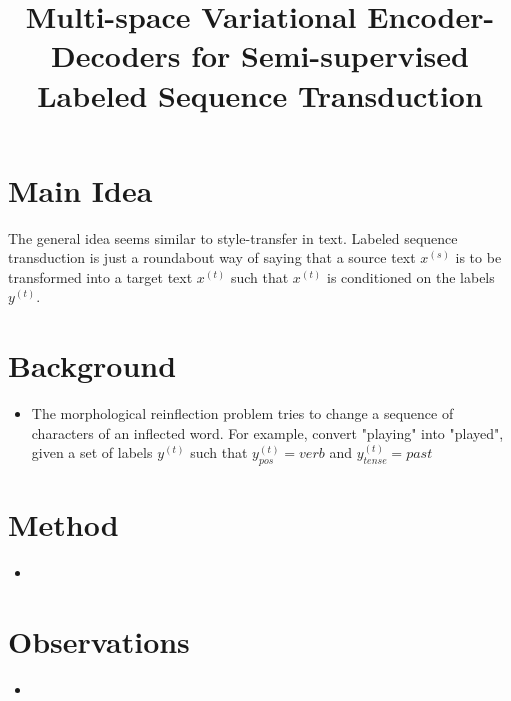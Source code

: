 \documentclass[12pt]{scrartcl}
\begin{document}
\title{Multi-space Variational Encoder-Decoders for Semi-supervised Labeled Sequence Transduction}
\author{}
\date{}
\maketitle

\section{Main Idea}
  The general idea \cite{zhou2017multi} seems similar to style-transfer in text. Labeled sequence transduction is just a roundabout way of saying that a source text $x^{(s)}$ is to be transformed into a target text $x^{(t)}$ such that $x^{(t)}$ is conditioned on the labels $y^{(t)}$.

\section{Background}
\begin{itemize}
  \item The morphological reinflection problem tries to change a sequence of characters of an inflected word. For example, convert "playing" into "played", given a set of labels $y^{(t)}$ such that $y^{(t)}_{pos}=verb$ and $y^{(t)}_{tense}=past$
\end{itemize}

\section{Method}
  \begin{itemize}
    \item 
  \end{itemize}

\section{Observations}
  \begin{itemize}
    \item 
  \end{itemize}



\end{document}
